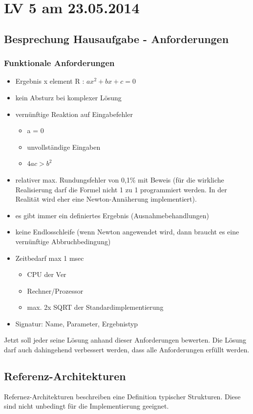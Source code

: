 \chapter{LV 5 am 23.05.2014}
\section{Besprechung Hausaufgabe - Anforderungen}
\subsection{Funktionale Anforderungen}
\begin{itemize}
\item Ergebnis x element R : $ax^2 + bx + c = 0$
\item kein Absturz bei komplexer Lösung
\item vernünftige Reaktion auf Eingabefehler
	\begin{itemize}
		\item a = 0
		\item unvollständige Eingaben
		\item $4ac > b^2$
	\end{itemize}
\item relativer max. Rundungsfehler von 0,1\% mit Beweis (für die wirkliche Realisierung darf die Formel nicht 1 zu 1 programmiert werden. In der Realität wird eher eine Newton-Annäherung implementiert).
\item es gibt immer ein definiertes Ergebnis (Ausnahmebehandlungen)
\item keine Endlosschleife (wenn Newton angewendet wird, dann braucht es eine vernünftige Abbruchbedingung)
\item Zeitbedarf max 1 msec
	\begin{itemize}
		\item CPU der Ver
		\item Rechner/Prozessor
		\item max. 2x SQRT der Standardimplementierung
	\end{itemize}
\item Signatur: Name, Parameter, Ergebnistyp
\end{itemize}

Jetzt soll jeder seine Lösung anhand dieser Anforderungen bewerten. Die Lösung darf auch dahingehend verbessert werden, dass alle Anforderungen erfüllt werden.

\section{Referenz-Architekturen}
Refernez-Architekturen beschreiben eine Definition typischer Strukturen. Diese sind nicht unbedingt für die Implementierung geeignet.

